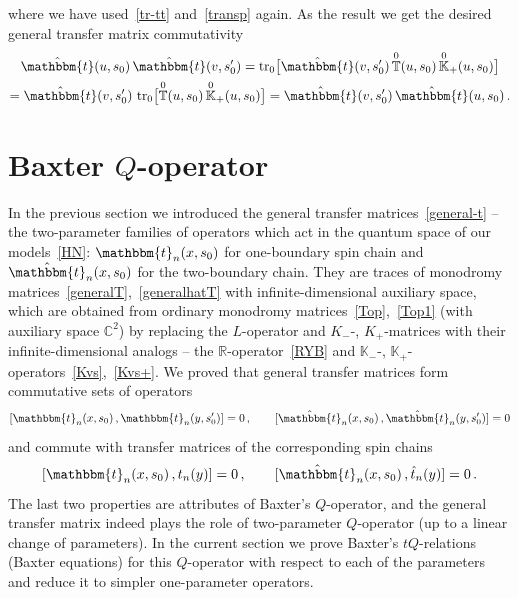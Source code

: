 \documentclass[a4paper,11pt]{article}
\newcommand{\tr}{\mathop{\rm tr}\nolimits}
\numberwithin{equation}{section}
\begin{document}
where we have used~\eqref{tr-tt} and~\eqref{transp} again.
As the result we get the desired general transfer matrix commutativity
\begin{multline} \nonumber
	\hat{\mathbbm{t}}(u,s_0)\,\hat{\mathbbm{t}}(v,s_0')
	= \tr_{0}\bigl[ \hat{\mathbbm{t}}(v,s_0') \,
	\overset{0}{\mathbb{T}}(u,s_0)\,\overset{0}{\mathbb{K}}_+(u,s_0)
	\bigr] \\
	= \hat{\mathbbm{t}}(v,s_0') \,
	\tr_{0}\bigl[  \overset{0}{\mathbb{T}}(u,s_0)\,\overset{0}{\mathbb{K}}_+(u,s_0) \bigr]
	= \hat{\mathbbm{t}}(v,s_0') \, \hat{\mathbbm{t}}(u,s_0) \,.
\end{multline}

\section{Baxter $Q$-operator} \label{sect:Q}

In the previous section we introduced the general transfer matrices~\eqref{general-t} --
the two-parameter families of operators which act in the quantum space of our models~\eqref{HN}: $\mathbbm{t}_n(x,s_0)$ for one-boundary spin chain and $\hat{\mathbbm{t}}_n(x,s_0)$ for the two-boundary chain.
They are traces of monodromy matrices~\eqref{generalT},~\eqref{generalhatT} with infinite-dimensional auxiliary space, which are obtained from ordinary monodromy matrices~\eqref{Top},~\eqref{Top1} (with auxiliary space $\mathbb{C}^2$) by replacing the $L$-operator and $K_-$-, $K_+$-matrices with their infinite-dimensional analogs -- the $\mathbb{R}$-operator~\eqref{RYB} and $\mathbb{K}_-$-, $\mathbb{K}_+$-operators~\eqref{Kvs},~\eqref{Kvs+}.
We proved that general transfer matrices form commutative sets of operators
\begin{equation} \nonumber %
	[\mathbbm{t}_n(x,s_0) \,, \mathbbm{t}_n(y,s_0')] = 0 \,, \qquad
	[\hat{\mathbbm{t}}_n(x,s_0) \,, \hat{\mathbbm{t}}_n(y,s_0')] = 0
\end{equation}
and commute with transfer matrices of the corresponding spin chains
\begin{equation} \nonumber %
	[\mathbbm{t}_n(x,s_0) \,, t_n(y)] = 0 \,, \qquad
	[\hat{\mathbbm{t}}_n(x,s_0) \,, \hat{t}_n(y)] = 0 \,.
\end{equation}
The last two properties are attributes of Baxter's $Q$-operator,
and the general transfer matrix indeed plays the role of two-parameter $Q$-operator (up to a linear change of parameters).
In the current section we prove Baxter's $tQ$-relations (Baxter equations) for this $Q$-operator with respect to each of the parameters and reduce it to simpler one-parameter operators.
\end{document}
